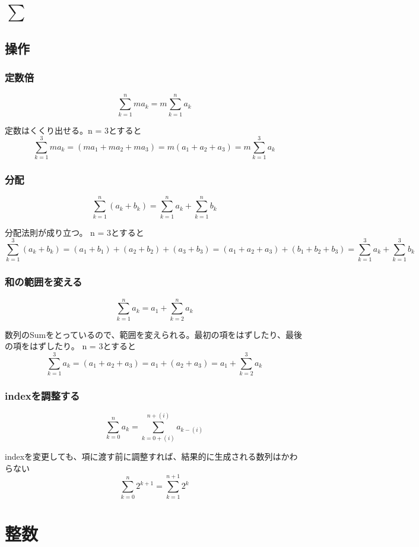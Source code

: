 \documentclass[dvipdfmx]{jsarticle}
\begin{document}
\section{$\sum$}

\subsection{操作}

\subsubsection{定数倍}
\[ \sum_{k=1}^{n}ma_k = m\sum_{k=1}^{n}a_k \]

定数はくくり出せる。n = 3とすると
\[ \sum_{k=1}^{3}ma_k = (ma_1 + ma_2 + ma_3) = m(a_1 + a_2 + a_3) = m\sum_{k=1}^{3}a_k \]

\subsubsection{分配}

\[ \sum_{k=1}^{n}(a_k + b_k) = \sum_{k=1}^{n}a_k + \sum_{k=1}^{n}b_k  \]

分配法則が成り立つ。 n = 3とすると
\[ \sum_{k=1}^{3}(a_k + b_k) = (a_1 + b_1) + (a_2 + b_2) + (a_3 + b_3) = (a_1 + a_2 + a_3) + (b_1 + b_2 + b_3) = \sum_{k=1}^{3}a_k + \sum_{k=1}^{3}b_k \]

\subsubsection{和の範囲を変える}

\[ \sum_{k=1}^{n}a_k = a_1 + \sum_{k=2}^{n}a_k \]

数列のSumをとっているので、範囲を変えられる。最初の項をはずしたり、最後の項をはずしたり。 n = 3とすると
\[ \sum_{k=1}^{3}a_k = (a_1 + a_2 + a_3) = a_1 + (a_2 + a_3) = a_1 + \sum_{k=2}^{3}a_k \]

\subsubsection{indexを調整する}

\[ \sum_{k=0}^{n}a_k = \sum_{k=0+(i)}^{n+(i)}a_{k-(i)} \]

indexを変更しても、項に渡す前に調整すれば、結果的に生成される数列はかわらない
\[ \sum_{k=0}^{n}2^{k+1} = \sum_{k=1}^{n+1}2^k \]

\section{整数}
\end{document}
